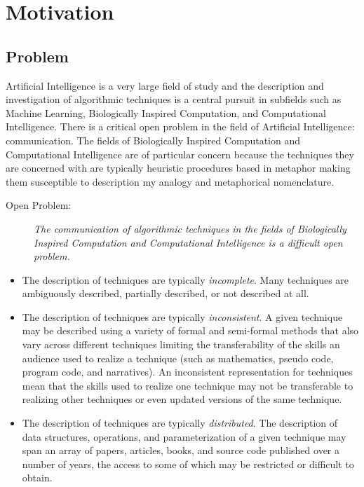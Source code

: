 \documentclass[a4paper, 11pt]{article}
\begin{document}
\section{Motivation}
\label{sec:motivation}

\subsection{Problem}
Artificial Intelligence is a very large field of study and the description and investigation of algorithmic techniques is a central pursuit in subfields such as Machine Learning, Biologically Inspired Computation, and Computational Intelligence. There is a critical open problem in the field of Artificial Intelligence: communication. The fields of Biologically Inspired Computation and Computational Intelligence are of particular concern because the techniques they are concerned with are typically heuristic procedures based in metaphor making them susceptible to description my analogy and metaphorical nomenclature.

\begin{description}
	\item[Open Problem:]\emph{The communication of algorithmic techniques in the fields of Biologically Inspired Computation and Computational Intelligence is a difficult open problem.}
\end{description}

\begin{itemize}
	\item The description of techniques are typically \emph{incomplete}. Many techniques are ambiguously described, partially described, or not described at all.
	\item The description of techniques are typically \emph{inconsistent}. A given technique may be described using a variety of formal and semi-formal methods that also vary across different techniques limiting the transferability of the skills an audience used to realize a technique (such as mathematics, pseudo code, program code, and narratives). An inconsistent representation for techniques mean that the skills used to realize one technique may not be transferable to realizing other techniques or even updated versions of the same technique.
	\item The description of techniques are typically \emph{distributed}. The description of data structures, operations, and parameterization of a given technique may span an array of papers, articles, books, and source code published over a number of years, the access to some of which may be restricted or difficult to obtain.
\end{itemize}
\end{document}
